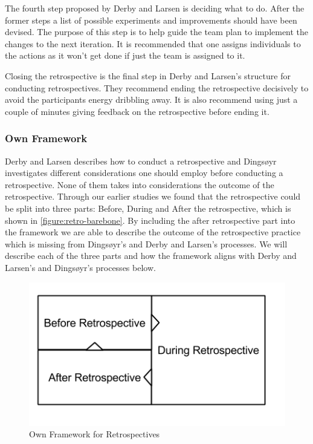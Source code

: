 The fourth step proposed by Derby and Larsen is deciding what to do. After the former steps a list of possible experiments and improvements should have been devised. The purpose of this step is to help guide the team plan to implement the changes to the next iteration. It is recommended that one assigns individuals to the actions as it won't get done if just the team is assigned to it. 

Closing the retrospective is the final step in Derby and Larsen's structure for conducting retrospectives. They recommend ending the retrospective decisively to avoid the participants energy dribbling away. It is also recommend using just a couple of minutes giving feedback on the retrospective before ending it. 

\subsubsection{Own Framework}
\label{subsubsec:own-framework}
Derby and Larsen describes how to conduct a retrospective and Dingsøyr investigates different considerations one should employ before conducting a retrospective. None of them takes into considerations the outcome of the retrospective. Through our earlier studies \cite{Dolvik2014} we found that the retrospective could be split into three parts: Before, During and After the retrospective, which is shown in \autoref{figure:retro-barebone}. By including the after retrospective part into the framework we are able to describe the outcome of the retrospective practice which is missing from Dingsøyr's and Derby and Larsen's processes. We will describe each of the three parts and how the framework aligns with Derby and Larsen's and Dingsøyr's processes below. 

\begin{figure}[!h]
	\centering
	\includegraphics[width=\textwidth, keepaspectratio]{figures/retro-barebone.png}
	\caption{Own Framework for Retrospectives}
	\label{figure:retro-barebone}
\end{figure}

